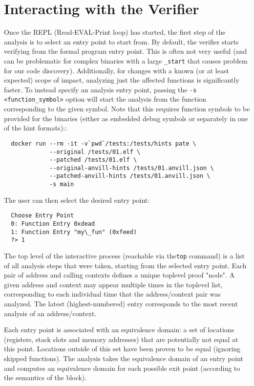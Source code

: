 \section{Interacting with the Verifier}
\label{sec:repl}

Once the REPL (Read-EVAL-Print loop) has started, the first step of the
analysis is to select an entry point to start from.  By default, the
verifier starts verifying from the formal program entry point. This is
often not very useful (and can be problematic for complex binaries with
a large \texttt{\_start} that causes problem for our code discovery).
Additionally, for changes with a known (or at least expected) scope of
impact, analyzing just the affected functions is significantly
faster. To instead specify an analysis entry point, passing the
\texttt{-s <function\_symbol>} option will start the analysis from the
function corresponding to the given symbol. Note that this requires
function symbols to be provided for the binaries (either as embedded
debug symbols or separately in one of the hint formats)::
\begin{verbatim}
  docker run --rm -it -v`pwd`/tests:/tests/hints pate \
             --original /tests/01.elf \
             --patched /tests/01.elf \
             --original-anvill-hints /tests/01.anvill.json \
             --patched-anvill-hints /tests/01.anvill.json \
             -s main
\end{verbatim}

The user can then select the desired entry point:
\begin{verbatim}
  Choose Entry Point
  0: Function Entry 0xdead
  1: Function Entry "my\_fun" (0xfeed)
  ?> 1
\end{verbatim}

The top level of the interactive process (reachable via the\texttt{top}
command) is a list of all analysis steps that were taken, starting from
the selected entry point.  Each pair of address and calling contexts
defines a unique toplevel proof "node". A given address and context may
appear multiple times in the toplevel list, corresponding to each
individual time that the address/context pair was analyzed. The latest
(highest-numbered) entry corresponds to the most recent analysis of an
address/context.

Each entry point is associated with an equivalence domain: a set of
locations (registers, stack slots and memory addresses) that are
potentially not equal at this point. Locations outside of this set have
been proven to be equal (ignoring skipped functions).  The analysis
takes the equivalence domain of an entry point and computes an
equivalence domain for each possible exit point (according to the
semantics of the block).

